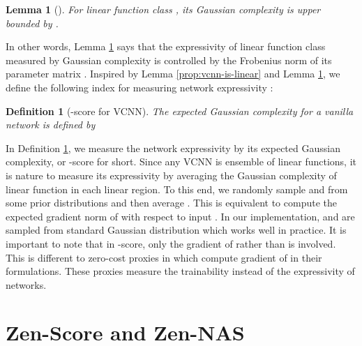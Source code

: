 \documentclass{article}
\newtheorem{lem}{Lemma}
\newtheorem{definition}{Definition}
\begin{document}
\begin{lem} [\cite{kakadeComplexityLinearPrediction2008}]
  \label{prop:gaussian-complexity-of-linear-classifier}
  For linear function class , its Gaussian complexity is upper bounded by .
\end{lem}

In other words, Lemma \ref{prop:gaussian-complexity-of-linear-classifier} says that the expressivity of linear function class measured by Gaussian complexity is controlled by the Frobenius norm of its  parameter matrix . Inspired by Lemma \ref{prop:vcnn-is-linear} and Lemma \ref{prop:gaussian-complexity-of-linear-classifier}, we define the following index for measuring  network expressivity :

\begin{definition}[-score for VCNN]
  \label{def:Expected-Gaussian-Complexity-for-VCNN}
  The expected Gaussian complexity for a vanilla network  is defined by
  
\end{definition}

In Definition \ref{def:Expected-Gaussian-Complexity-for-VCNN}, we measure the network expressivity by its expected Gaussian complexity, or -score for short. Since any VCNN is ensemble of linear functions, it is nature to measure its expressivity by averaging the Gaussian complexity of linear function in each linear region. To this end, we randomly sample  and  from some prior distributions and then average . This is equivalent to compute the expected gradient norm of  with respect to input . In our implementation,  and  are sampled from standard Gaussian distribution which works well in practice. It is important to note that in -score, only the gradient of  rather than  is involved. This is different to zero-cost proxies in \cite{abdelfattahZeroCostProxiesLightweight2021} which compute gradient of  in their formulations. These proxies  measure the trainability  \cite{wangPickingWinningTickets2019,chen2021neural} instead of the expressivity of networks.

\section{Zen-Score and Zen-NAS}
\label{sec:zen-score-and-zen-nas}
\end{document}
